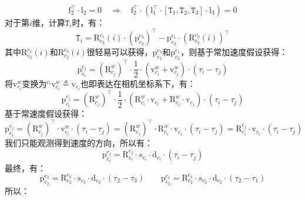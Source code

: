 \documentclass[12pt, onecolumn]{article}
\newcommand\bsm[1]{\boldsymbol{\mathrm{#1}}}
\newcommand\rotation[2]{{\bsm{R}_{#1}^{#2}}}
\newcommand\translation[2]{{\bsm{p}_{#1}^{#2}}}
\newcommand\linvel[2]{{\bsm{v}_{#1}^{#2}}}
\begin{document}
	\begin{equation}
	\bsm{f}_2^\top\cdot\bsm{l}_2=0\quad\Rightarrow\quad
	\bsm{f}_2^\top\cdot\left(\bsm{l}_1^\top\cdot\left[ \texttt{T}_1,\texttt{T}_2,\texttt{T}_3\right]\cdot\bsm{l}_3  \right)=0
	\end{equation}
	对于第$i$维，计算$\texttt{T}_i$时，有：
	\begin{equation}
	\texttt{T}_i=\rotation{c_2}{c_1}(i)\cdot\left( \translation{c_2}{c_3}\right)^\top-\translation{c_2}{c_1}\cdot\left(\rotation{c_2}{c_3}(i)\right)^\top
	\end{equation}
	其中$\rotation{c_2}{c_1}(i)$和$\rotation{c_2}{c_3}(i)$很轻易可以获得，$\translation{c_2}{c_3}$和$\translation{c_2}{c_1}$，则基于常加速度假设获得：
	\begin{equation}
	\translation{c_i}{c_j}=\left( \rotation{c_j}{w}\right)^\top\cdot\frac{1}{2}\cdot\left(\linvel{c_i}{w}+\linvel{c_j}{w} \right) \cdot\left( \tau_i-\tau_j\right) 
	\end{equation}
	将$\linvel{c_i}{w}$变换为$^{c_i}\linvel{c_i}{w}\triangleq\bsm{v}_{c_i}$也即表达在相机坐标系下，有：
	\begin{equation}
	\translation{c_i}{c_j}=\left( \rotation{c_j}{w}\right)^\top\cdot\frac{1}{2}\cdot\left(\rotation{c_i}{w}\cdot\bsm{v}_{c_i}+\rotation{c_j}{w}\cdot\bsm{v}_{c_j} \right) \cdot\left( \tau_i-\tau_j\right) 
	\end{equation}
	基于常速度假设获得：
	\begin{equation}
	\translation{c_i}{c_j}=\left( \rotation{c_j}{w}\right)^\top\cdot\linvel{c_i}{w} \cdot\left( \tau_i-\tau_j\right)
	=\left( \rotation{c_j}{w}\right)^\top\cdot\rotation{c_i}{w}\cdot\bsm{v}_{c_i} \cdot\left( \tau_i-\tau_j\right)
	=\rotation{c_i}{c_j}\cdot\bsm{v}_{c_i} \cdot\left( \tau_i-\tau_j\right)
	\end{equation}
	我们只能观测得到速度的方向，所以有：
	\begin{equation}
	\translation{c_i}{c_j}=\rotation{c_i}{c_j}\cdot s_{c_i}\cdot\bsm{d}_{c_i} \cdot\left( \tau_i-\tau_j\right)
	\end{equation}
	最终，有：
	\begin{equation}
	\translation{c_2}{c_3}=\rotation{c_2}{c_3}\cdot s_{c_2}\cdot\bsm{d}_{c_2} \cdot\left( \tau_2-\tau_3\right)
	\qquad
	\translation{c_2}{c_1}=\rotation{c_2}{c_1}\cdot s_{c_2}\cdot\bsm{d}_{c_2} \cdot\left( \tau_2-\tau_1\right)
	\end{equation}
	所以：
\end{document}
